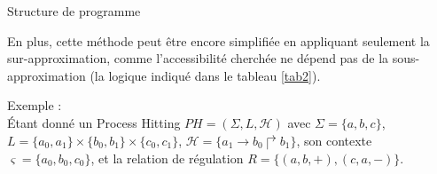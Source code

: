 \documentclass[11pt]{report}
\theoremstyle{definition}
\newcommand{\acm}[3]{#1\to#2\Rsh#3}
\begin{document}
\begin{algorithm}[ht]
 \caption{Structure de programme}
\end{algorithm}
En plus, cette m\'ethode peut \^etre encore simplifi\'ee en appliquant seulement la sur-approximation, comme l'accessibilit\'e cherch\'ee ne d\'epend pas de la sous-approximation (la logique indiqu\'e dans le tableau \ref{tab2}).

Exemple :\\
\'Etant donn\'e un Process Hitting $PH=(\Sigma,L,\mathscr{H})$ avec $\Sigma=\{a,b,c\}$, $L=\{a_0,a_1\}\times\{b_0,b_1\}\times\{c_0,c_1\}$, $\mathscr{H}=\{\acm{a_1}{b_0}{b_1}\}$, son contexte $\varsigma=\{a_0,b_0,c_0\}$, et la relation de r\'egulation $R=\{(a,b,+),(c,a,-)\}$.
\end{document}
